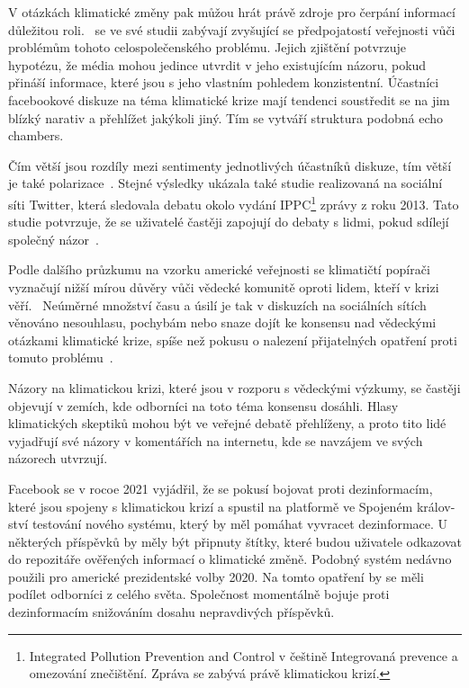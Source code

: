     V otázkách klimatické změny pak můžou hrát právě zdroje pro čerpání informací důležitou roli.~\cite{carmichael} se ve své studii zabývají zvyšující se předpojatostí veřejnosti vůči problémům tohoto celospolečenského problému. Jejich zjištění potvrzuje hypotézu, že média mohou jedince utvrdit v jeho existujícím názoru, pokud přináší informace, které jsou s jeho vlastním pohledem konzistentní. Účastníci facebookové diskuze na téma klimatické krize mají tendenci soustředit se na jim blízký narativ a přehlížet jakýkoli jiný. Tím se vytváří struktura podobná echo chambers.
    
    Čím větší jsou rozdíly mezi sentimenty jednotlivých účastníků diskuze, tím větší je také polarizace~\citep{Zollo2019}. Stejné výsledky ukázala také studie realizovaná na sociální síti Twitter, která sledovala debatu okolo vydání IPPC\footnote{Integrated Pollution Prevention and Control v češtině Integrovaná prevence a omezování znečištění. Zpráva se zabývá právě klimatickou krizí.} zprávy z roku 2013. Tato studie potvrzuje, že se uživatelé častěji zapojují do debaty s lidmi, pokud sdílejí společný názor~\citep{pearce2014climate}.
    
    Podle dalšího průzkumu na vzorku americké veřejnosti se klimatičtí popírači vyznačují nižší mírou důvěry vůči vědecké komunitě oproti lidem, kteří v krizi věří.~\citep{krishna2021understanding} Neúměrné množství času a úsilí je tak v diskuzích na sociálních sítích věnováno nesouhlasu, pochybám nebo snaze dojít ke konsensu nad vědeckými otázkami klimatické krize, spíše než pokusu o nalezení přijatelných opatření proti tomuto problému~\citep{martin2014rebalancing}.
    
    Názory na klimatickou krizi, které jsou v rozporu s vědeckými výzkumy, se častěji objevují v zemích, kde odborníci na toto téma konsensu dosáhli. Hlasy klimatických skeptiků mohou být ve veřejné debatě přehlíženy, a proto tito lidé vyjadřují své názory v komentářích na internetu, kde se navzájem ve svých názorech utvrzují.~\citep{walter2018echo} 
    
    Facebook se v rocoe 2021 vyjádřil, že se pokusí bojovat proti dezinformacím, které jsou spojeny s klimatickou krizí a spustil na platformě ve Spojeném králov-ství testování nového systému, který by měl pomáhat vyvracet dezinformace. U některých příspěvků by měly být připnuty štítky, které budou uživatele odkazovat do repozitáře ověřených informací o klimatické změně. Podobný systém nedávno použili pro americké prezidentské volby 2020. Na tomto opatření by se měli podílet odborníci z celého světa. Společnost momentálně bojuje proti dezinformacím snižováním dosahu nepravdivých příspěvků.~\citep{hern_2021}
    
